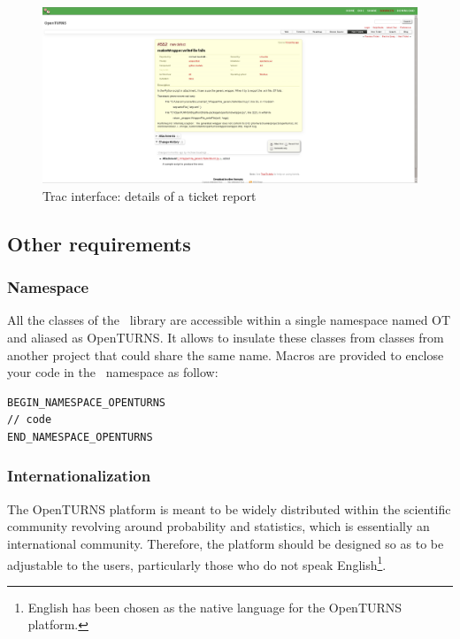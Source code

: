 \begin{figure}[ht]
\begin{center}
\includegraphics[scale=0.33]{Figures/Tickets2.png}
\caption{Trac interface: details of a ticket report}\label{fig:ticket2}
\end{center}
\end{figure}

\subsection{Other requirements}

\label{namespace}\subsubsection{Namespace}

All the classes of the \OT\ library are accessible within a single namespace named OT and aliased as OpenTURNS. It allows to insulate these classes from classes from another project that could share the same name. Macros are provided to enclose your code in the \OT\ namespace as follow:

\begin{lstlisting}
BEGIN_NAMESPACE_OPENTURNS
// code
END_NAMESPACE_OPENTURNS
\end{lstlisting}

\subsubsection{Internationalization}

The OpenTURNS platform is meant to be widely distributed within the scientific community revolving around probability and statistics, which is essentially an international community. Therefore, the platform should be designed so as to be adjustable to the users, particularly those who do not speak English\footnote{English has been chosen as the native language for the OpenTURNS platform.}.

